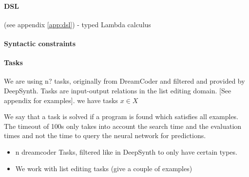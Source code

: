 \paragraph{DSL}
(see appendix \ref{app:dsl})
- typed Lambda calculus 

\paragraph{Syntactic constraints}

\paragraph{Tasks}
We are using n? tasks, originally from DreamCoder and filtered and provided by DeepSynth.
Tasks are input-output relations in the list editing domain. [See appendix for examples]. 
we have tasks $x \in X$

We say that a task is solved if a program is found which satisfies all examples. The timeout of 100s only takes into account the search time and the evaluation times and not the time to query the neural network for predictions.

\begin{itemize}
    \item n dreamcoder Tasks, filtered like in DeepSynth to only have certain types.
    \item We work with list editing tasks (give a couple of examples)
\end{itemize}


